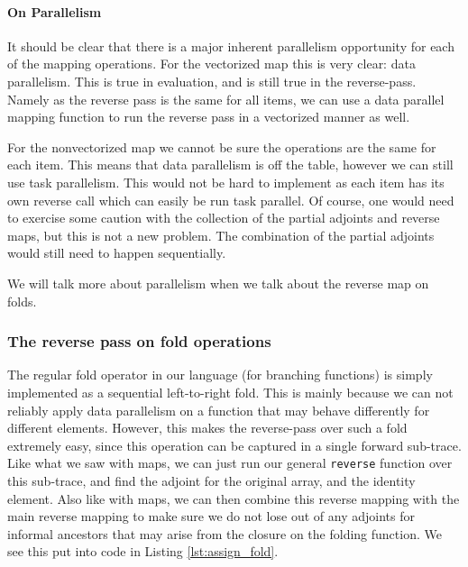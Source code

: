             \paragraph*{On Parallelism}
                It should be clear that there is a major inherent parallelism opportunity for each of the mapping operations.
                For the vectorized map this is very clear: data parallelism.
                This is true in evaluation, and is still true in the reverse-pass.
                Namely as the reverse pass is the same for all items, we can use a data parallel mapping function to run the reverse pass in a vectorized manner as well.

                For the nonvectorized map we cannot be sure the operations are the same for each item.
                This means that data parallelism is off the table, however we can still use task parallelism.
                This would not be hard to implement as each item has its own reverse call which can easily be run task parallel.
                Of course, one would need to exercise some caution with the collection of the partial adjoints and reverse maps, but this is not a new problem.
                The combination of the partial adjoints would still need to happen sequentially.

                We will talk more about parallelism when we talk about the reverse map on folds.

        \subsubsection{The reverse pass on fold operations}
            The regular fold operator in our language (for branching functions) is simply implemented as a sequential left-to-right fold.
            This is mainly because we can not reliably apply data parallelism on a function that may behave differently for different elements.
            However, this makes the reverse-pass over such a fold extremely easy, since this operation can be captured in a single forward sub-trace.
            Like what we saw with maps, we can just run our general \texttt{reverse} function over this sub-trace, and find the adjoint for the original array, and the identity element.
            Also like with maps, we can then combine this reverse mapping with the main reverse mapping to make sure we do not lose out of any adjoints for informal ancestors that may arise from the closure on the folding function.
            We see this put into code in Listing \ref{lst:assign_fold}.

